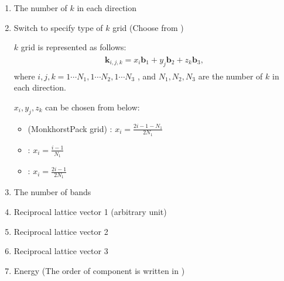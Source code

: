 \documentclass[letterpaper,10pt,pdftex,openany,english]{sphinxmanual}
\begin{document}
\begin{enumerate}
%
\item {} 
\sphinxAtStartPar
The number of \(k\) in each direction

\item {} 
\sphinxAtStartPar
Switch to specify type of \(k\) grid (Choose from )

\sphinxAtStartPar
\(k\) grid is represented as follows:
\begin{equation*}
\begin{split}\begin{align} {\boldsymbol k}_{i,j,k} =
x_i {\boldsymbol b}_1 + y_j {\boldsymbol b}_2 + z_k {\boldsymbol b}_3,
\end{align}\end{split}
\end{equation*}
\sphinxAtStartPar
where \(i, j, k = 1 \cdots N_1, 1 \cdots N_2, 1 \cdots N_3\) , and
\(N_1, N_2, N_3\) are the number of \(k\) in each direction.

\sphinxAtStartPar
\(x_i, y_j,z_k\) can be chosen from below:
\begin{itemize}
\item {} 
\sphinxAtStartPar
{} (Monkhorst\sphinxhyphen{}Pack grid) : \(x_i = \frac{2 i - 1 - N_1}{2 N_1}\)

\item {} 
\sphinxAtStartPar
{} : \(x_i = \frac{i - 1}{N_1}\)

\item {} 
\sphinxAtStartPar
{} : \(x_i = \frac{2 i - 1}{2 N_1}\)

\end{itemize}

\item {} 
\sphinxAtStartPar
The number of bands

\item {} 
\sphinxAtStartPar
Reciprocal lattice vector 1 (arbitrary unit)

\item {} 
\sphinxAtStartPar
Reciprocal lattice vector 2

\item {} 
\sphinxAtStartPar
Reciprocal lattice vector 3

\item {} 
\sphinxAtStartPar
Energy (The order of component is written in  {\hyperref[\detokenize{input:format}]{}} )


\end{enumerate}
\end{document}
